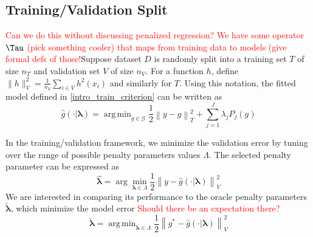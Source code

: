 \documentclass[12pt]{article}
\DeclareMathOperator*{\argmin}{arg\,min}
\begin{document}
\subsection{Training/Validation Split}

\textcolor{red}{Can we do this without discussing penalized regression? We have some operator $\Tau$ (pick something cooler) that maps from training data to models (give formal defs of those!}Suppose dataset $D$ is randomly split into a training set $T$ of size $n_T$ and validation set $V$ of size $n_V$. For a function $h$, define $\| h \|_V^2 = \frac{1}{n_V}\sum_{i\in V} h^2(x_i)$ and similarly for $T$. Using this notation, the fitted model defined in  \eqref{intro_train_criterion} can be written as
\begin{equation}
\hat{g}(\cdot | \boldsymbol \lambda) = \argmin_{g\in \mathcal{G}} \frac{1}{2} \left \|y -  g \right \|_T^2 + \sum_{j=1}^J \lambda_j P_j(g)
\end{equation}

In the training/validation framework, we minimize the validation error by tuning over the range of possible penalty parameters values $\Lambda$. The selected penalty parameter can be expressed as
\begin{equation}
\label{cv_lambda}
\hat{\boldsymbol \lambda} = \arg\min_{\boldsymbol{\lambda} \in\Lambda} \frac{1}{2} \left \| y-\hat{g}(\cdot | \boldsymbol \lambda) \right \|_{V}^{2}
\end{equation}
We are interested in comparing its performance to the oracle penalty parameters $\tilde{\boldsymbol \lambda}$, which minimize the model error \textcolor{red}{Should there be an expectation there?}
\begin{equation}
\tilde{\boldsymbol \lambda} = \argmin_{\boldsymbol{\lambda} \in \Lambda} \frac{1}{2} \left \| g^* - \hat{g}(\cdot | \boldsymbol \lambda) \right \|^2_V
\end{equation}
\end{document}
